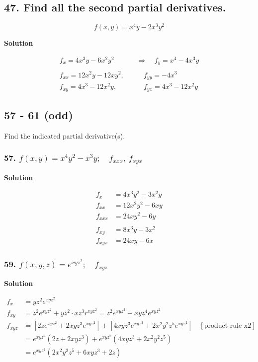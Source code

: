 \documentclass{article}
\newcommand\rr{\quad\Rightarrow\quad}
\newcommand{\solution}{\centerline{\textbf{Solution}}}
\begin{document}
\subsection*{47. Find all the second partial derivatives.}
\[
f(x,y) = x^4y - 2x^3y^2
\]
\solution
\begin{align*}
    f_x = 4x^3y - 6x^2y^2 &\rr f_y = x^4 -4x^3y \\\\
    f_{xx} = 12x^2y - 12xy^2 ,&\qquad f_{yy} = -4x^3 \\
    f_{xy} = 4x^3 -12x^2y ,&\qquad f_{yx} = 4x^3 -12x^2y
\end{align*}
\subsection*{57 - 61 (odd)}
Find the indicated partial derivative(s).
\subsubsection*{57. $f(x,y) = x^4y^2 - x^3y;\quad f_{xxx},\: f_{xyx}$}
\solution
\begin{align*}
    f_x &= 4x^3y^2 - 3x^2y \\
    f_{xx} &= 12x^2y^2 - 6xy \\
    f_{xxx} &= 24xy^2 - 6y \\\\
    f_{xy} &= 8x^3y - 3x^2 \\
    f_{xyx} &= 24xy - 6x 
\end{align*}
\subsubsection*{59. $f(x,y,z) = e^{xyz^2}; \quad f_{xyz}$}
\solution
\begin{align*}
    f_x &= yz^2e^{xyz^2} \\
    f_{xy} &= z^2e^{xyz^2} + yz^2\cdot xz^3r^{xyz^2} = z^2e^{xyz^2} + xyz^4e^{xyz^2} \\
    f_{xyz} &= [2ze^{xyz^2} + 2xyz^3e^{xyz^2}] + [4xyz^3e^{xyz^2} + 2x^2y^2z^5e^{xyz^2}] \quad [\text{product rule x2}] \\
            &= e^{xyz^2}(2z+2xyz^3) + e^{xyz^2}(4xyz^3 + 2x^2y^2z^5) \\
            &= e^{xyz^2}(2x^2y^2z^5 + 6xyz^3 + 2z)
\end{align*}
\end{document}

